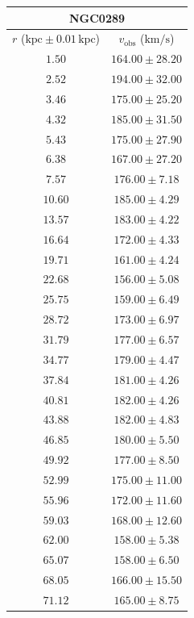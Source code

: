 \documentclass{article}
\newcommand\kpc{\textrm{kpc}}
\newcommand\kmps{\textrm{km}/\textrm{s}}
\newcommand\vobs{\ensuremath{v_{\textrm{obs}}}}
\begin{document}
\begin{table}[h!]
    \begin{tabular}{|c|c|}
        \hline
        \multicolumn{2}{|c|}{NGC0289} \\
        \hline
        $r$ ($\kpc \pm 0.01 \,\kpc$) & $\vobs$ ($\kmps$) \\
        \hline
        $1.50$ & $164.00 \pm 28.20$ \\
        $2.52$ & $194.00 \pm 32.00$ \\
        $3.46$ & $175.00 \pm 25.20$ \\
        $4.32$ & $185.00 \pm 31.50$ \\
        $5.43$ & $175.00 \pm 27.90$ \\
        $6.38$ & $167.00 \pm 27.20$ \\
        $7.57$ & $176.00 \pm 7.18$ \\
        $10.60$ & $185.00 \pm 4.29$ \\
        $13.57$ & $183.00 \pm 4.22$ \\
        $16.64$ & $172.00 \pm 4.33$ \\
        $19.71$ & $161.00 \pm 4.24$ \\
        $22.68$ & $156.00 \pm 5.08$ \\
        $25.75$ & $159.00 \pm 6.49$ \\
        $28.72$ & $173.00 \pm 6.97$ \\
        $31.79$ & $177.00 \pm 6.57$ \\
        $34.77$ & $179.00 \pm 4.47$ \\
        $37.84$ & $181.00 \pm 4.26$ \\
        $40.81$ & $182.00 \pm 4.26$ \\
        $43.88$ & $182.00 \pm 4.83$ \\
        $46.85$ & $180.00 \pm 5.50$ \\
        $49.92$ & $177.00 \pm 8.50$ \\
        $52.99$ & $175.00 \pm 11.00$ \\
        $55.96$ & $172.00 \pm 11.60$ \\
        $59.03$ & $168.00 \pm 12.60$ \\
        $62.00$ & $158.00 \pm 5.38$ \\
        $65.07$ & $158.00 \pm 6.50$ \\
        $68.05$ & $166.00 \pm 15.50$ \\
        $71.12$ & $165.00 \pm 8.75$ \\
        \hline
    \end{tabular}
\end{table}
\end{document}
